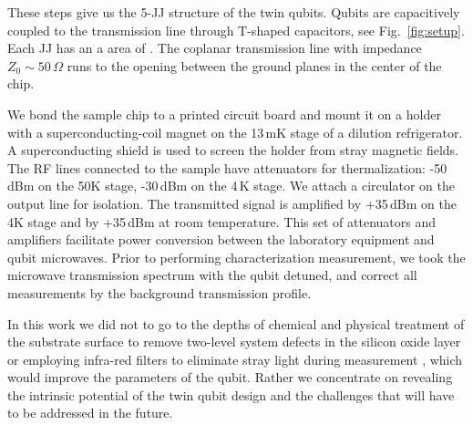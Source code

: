 These steps give us the 5-JJ structure of the twin qubits. Qubits are capacitively coupled to
the transmission line through T-shaped capacitors,  see Fig.~\ref{fig:setup}.  Each JJ has an
a  area   of  .   The   coplanar  transmission  line   with  impedance
$ Z_{0} \sim 50\,\Omega $ runs to the opening between the ground planes in the center of the chip.

We  bond the  sample  chip to  a  printed circuit  board and  mount  it on  a  holder with  a
superconducting-coil   magnet  on   the  13\,mK   stage  of   a  dilution   refrigerator.   A
superconducting shield is used to screen the  holder from stray magnetic fields. The RF lines
connected  to the  sample have  attenuators for  thermalization: -50\,dBm  on the  50K stage,
-30\,dBm on  the 4\,K stage.  We  attach a circulator on  the output line for  isolation. The
transmitted  signal is  amplified  by  +35\,dBm on  the  4K stage  and  by  +35\,dBm at  room
temperature.  This set of attenuators and  amplifiers facilitate power conversion between the
laboratory equipment and qubit microwaves.  Prior to performing characterization measurement,
we  took  the  microwave transmission  spectrum  with  the  qubit  detuned, and  correct  all
measurements by the background transmission profile.

In this  work we  did not  to go  to the  depths of  chemical and  physical treatment  of the
substrate  surface   to  remove  two-level  system   defects  in  the  silicon   oxide  layer
\cite{earnest2018} or employing infra-red filters to eliminate stray light during measurement
\cite{barends2011}, which would improve the parameters of the qubit. Rather we concentrate on
revealing the intrinsic potential of the twin  qubit design and the challenges that will have
to be addressed in the future.

